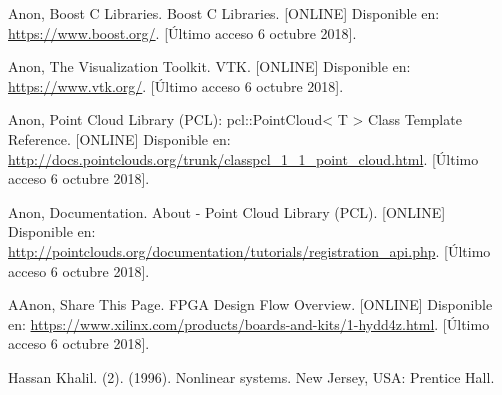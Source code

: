 \begin{thebibliography}{99}
 Anon, Boost C Libraries. Boost C Libraries. [ONLINE] Disponible en: \url{ https://www.boost.org/}. [Último acceso 6 octubre 2018].


 Anon, The Visualization Toolkit. VTK. [ONLINE] Disponible en: \url{https://www.vtk.org/}. [Último acceso 6 octubre 2018].

 Anon, Point Cloud Library (PCL): pcl::PointCloud< T > Class Template Reference. [ONLINE] Disponible en: \url{http://docs.pointclouds.org/trunk/classpcl_1_1_point_cloud.html}. [Último acceso 6 octubre 2018].


 Anon, Documentation. About - Point Cloud Library (PCL).  [ONLINE] Disponible en: \url{http://pointclouds.org/documentation/tutorials/registration_api.php}. [Último acceso 6 octubre 2018].



 AAnon, Share This Page. FPGA Design Flow Overview.   [ONLINE] Disponible en: \url{https://www.xilinx.com/products/boards-and-kits/1-hydd4z.html}. [Último acceso 6 octubre 2018].













 Hassan Khalil. (2). (1996). Nonlinear systems. New Jersey, USA: Prentice Hall. %
\end{thebibliography}
